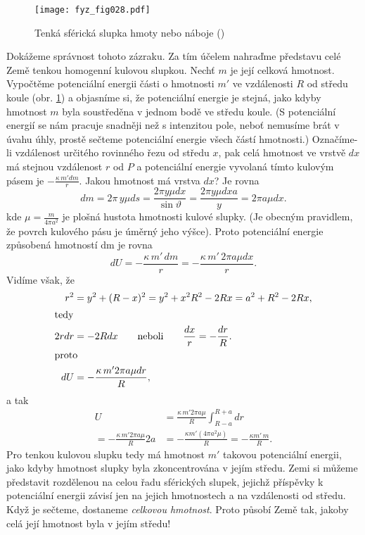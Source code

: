     \begin{figure}[ht!]  %
      \centering
      \texttt{[image: fyz\_fig028.pdf]}
      \caption{Tenká sférická slupka hmoty nebo náboje (\cite[s.~195]{Feynman01})}
      \label{fyz:fig028}
    \end{figure}
    Dokážeme správnost tohoto zázraku. Za tím účelem nahraďme představu celé Země tenkou homogenní 
    kulovou slupkou. Nechť \(m\) je její celková hmotnost. Vypočtěme potenciální energii části o 
    hmotnosti \(m'\) ve vzdálenosti \(R\) od středu koule (obr. \ref{fyz:fig028}) a objasníme si, 
    že potenciální energie je stejná, jako kdyby hmotnost \(m\) byla soustředěna v jednom bodě ve 
    středu koule. (S potenciální energií se nám pracuje snadněji než s intenzitou pole, neboť 
    nemusíme brát v úvahu úhly, prostě sečteme potenciální energie všech částí hmotnosti.) 
    Označíme-li vzdálenost určitého rovinného řezu od středu \(x\), pak celá hmotnost ve vrstvě 
    \(dx\) má stejnou vzdálenost \(r\) od \(P\) a potenciální energie vyvolaná tímto kulovým pásem 
    je \(-\frac{\kappa\,m'dm}{r}\). Jakou hmotnost má vrstva \(dx\)? Je rovna
    \begin{equation}\label{FYZ:eq049}
      dm = 2\pi\,y\mu ds = \frac{2\pi y\mu dx}{\sin\vartheta} 
         = \frac{2\pi y\mu dxa}{y} = 2\pi a\mu dx.
    \end{equation}
    kde \(\mu = \frac{m}{4\pi a^2}\) je plošná hustota hmotnosti kulové slupky. (Je obecným 
    pravidlem, že povrch kulového pásu je úměrný jeho výšce). Proto potenciální energie způsobená 
    hmotností dm je rovna
    \begin{equation}\label{FYZ:eq050}
      dU = -\frac{\kappa\,m'\,dm}{r} = -\frac{\kappa\,m'\,2\pi a\mu dx}{r}.
    \end{equation}
    Vidíme však, že
    \begin{align*}
      r^2  &= y^2 + (R-x)^2 = y^2 + x^2 R^2 - 2Rx = a^2 + R^2 - 2Rx,           \\
      \shortintertext{tedy}
      2rdr &= -2Rdx \qquad \text{neboli} \qquad \frac{dx}{r} = - \frac{dr}{R}. \\
      \shortintertext{proto}
      dU   &= - \frac{\kappa\,m'2\pi a\mu dr}{R},
    \end{align*}
    a tak
    \begin{align}
      U  &=   \frac{\kappa\,m'2\pi a\mu}{R}\int_{R-a}^{R+a}dr               \nonumber \\ 
          = - \frac{\kappa\,m'2\pi a\mu}{R}2a                                
         &= - \frac{\kappa m'(4\pi a^2\mu)}{R} = -\frac{\kappa m'\,m}{R}.    \label{FYZ:eq051}
    \end{align}    
    Pro tenkou kulovou slupku tedy má hmotnost \(m'\) takovou potenciální energii, jako kdyby 
    hmotnost slupky byla zkoncentrována v jejím středu. Zemi si můžeme představit rozdělenou na 
    celou řadu sférických slupek, jejichž příspěvky k potenciální energii závisí jen na jejich 
    hmotnostech a na vzdálenosti od středu. Když je sečteme, dostaneme \emph{celkovou hmotnost}. 
    Proto působí Země tak, jakoby celá její hmotnost byla v jejím středu!
    
